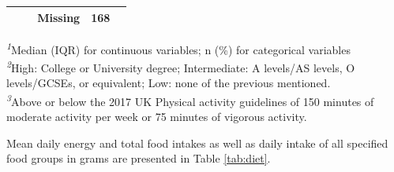 \documentclass[nutrients,article,submit,moreauthors,pdftex]{Definitions/mdpi}
\begin{document}
\begin{table}[t]
\begin{tabular*}{1\linewidth}{@{\extracolsep{\fill}}lcc}
    Missing & 168 &  \\
\bottomrule
\end{tabular*}
\begin{minipage}{\linewidth}
\textsuperscript{\textit{1}}Median (IQR) for continuous variables; n (\%) for categorical variables\\
\textsuperscript{\textit{2}}High: College or University degree;
Intermediate: A levels/AS levels, O levels/GCSEs, or equivalent;
Low: none of the previous mentioned.\\
\textsuperscript{\textit{3}}Above or below the 2017 UK Physical activity guidelines of 150 minutes of moderate activity per week or 75 minutes of vigorous activity.\\
\end{minipage}
\end{table}

Mean daily energy and total food intakes as well as daily intake of all
specified food groups in grams are presented in Table \ref{tab:diet}.
\end{document}
